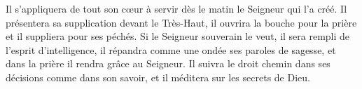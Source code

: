 Il s’appliquera de tout son cœur à servir dès le matin le Seigneur qui l’a créé.
Il présentera sa supplication devant le Très-Haut,
	il ouvrira la bouche pour la prière et il suppliera pour ses péchés.
Si le Seigneur souverain le veut, il sera rempli de l’esprit d’intelligence,
	il répandra comme une ondée ses paroles de sagesse,
	et dans la prière il rendra grâce au Seigneur.
Il suivra le droit chemin dans ses décisions comme dans son savoir,
	et il méditera sur les secrets de Dieu.
